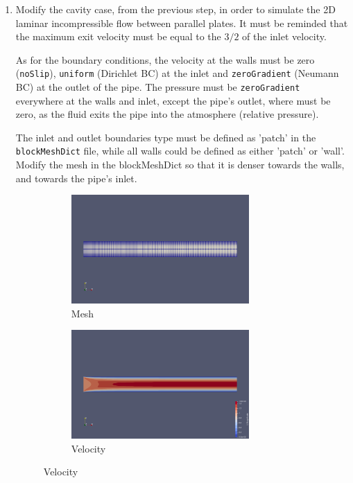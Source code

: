 \documentclass{article}
\begin{document}
\begin{enumerate}
 	\item Modify the cavity case, from the previous step, in order to simulate the 2D laminar incompressible flow between parallel plates. It must be reminded that the maximum exit velocity must be equal to the $3/2$ of the inlet velocity.
 	
 	As for the boundary conditions, the velocity at the walls must be zero ({\tt noSlip}), {\tt uniform} (Dirichlet BC) at the inlet and {\tt zeroGradient} (Neumann BC) at the outlet of the pipe. The pressure must be {\tt zeroGradient} everywhere at the walls and inlet, except the pipe's outlet, where must be zero, as the fluid exits the pipe into the atmosphere (relative pressure). 
 	
 	The inlet and outlet boundaries type must be defined as 'patch' in the {\tt blockMeshDict} file, while all walls could be defined as either 'patch' or 'wall'. Modify the mesh in the blockMeshDict so that it is denser towards the walls, and towards the pipe’s inlet.
 	

	\begin{figure}[h]
		\begin{subfigure}{\textwidth}
			\centering
			\includegraphics[width=0.8\textwidth,trim={0cm 12cm 0 12cm},clip]{2D_mesh.png}
			\caption{Mesh}
		\end{subfigure}
 		\begin{subfigure}{\textwidth}
 			\centering
 			\includegraphics[width=0.8\textwidth,trim={0cm 12cm 0 12cm},clip]{2D_velocity.png}
 			\caption{Velocity}
 		\end{subfigure}	
 	\end{figure}
 	

\end{enumerate}
\end{document}
